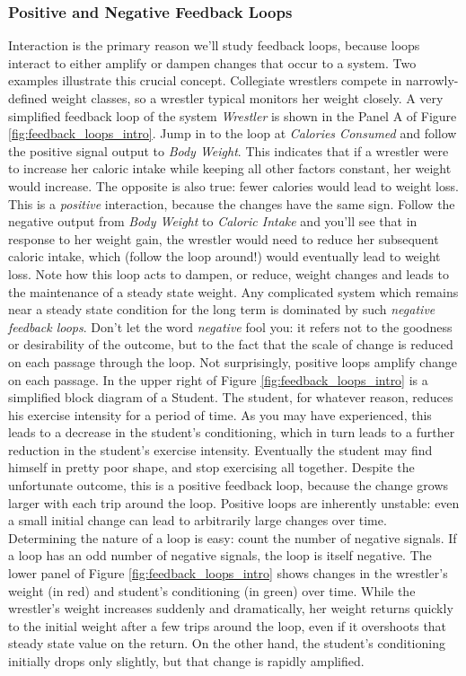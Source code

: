 \subsubsection{Positive and Negative Feedback Loops}
Interaction is the primary reason we'll study feedback loops, because loops interact to either amplify or dampen changes that occur to a system. Two examples illustrate this crucial concept. Collegiate wrestlers compete in narrowly-defined weight classes, so a wrestler typical monitors her weight closely. A very simplified feedback loop of the system \textit{Wrestler} is shown in the Panel A of Figure \ref{fig:feedback_loops_intro}. Jump in to the loop at \textit{Calories Consumed} and follow the positive signal output to \textit{Body Weight}. This indicates that if a wrestler were to increase her caloric intake while keeping all other factors constant, her weight would increase. The opposite is also true: fewer calories would lead to weight loss. This is a \emph{positive} interaction, because the changes have the same sign. Follow the negative output from \textit{Body Weight} to \textit{Caloric Intake} and you'll see that in response to her weight gain, the wrestler would need to reduce her subsequent caloric intake, which (follow the loop around!) would eventually lead to weight loss. Note how this loop acts to dampen, or reduce, weight changes and leads to the maintenance of a steady state weight. Any complicated system which remains near a steady state condition for the long term is dominated by such \emph{negative feedback loops}. Don't let the word \textit{negative} fool you: it refers not to the goodness or desirability of the outcome, but to the fact that the scale of change is reduced on each passage through the loop.
Not surprisingly, positive loops amplify change on each passage. In the upper right of Figure \ref{fig:feedback_loops_intro} is a simplified block diagram of a Student. The student, for whatever reason, reduces his exercise intensity for a period of time. As you may have experienced, this leads to a decrease in the student's conditioning, which in turn leads to a further reduction in the student's exercise intensity. Eventually the student may find himself in pretty poor shape, and stop exercising all together. Despite the unfortunate outcome, this is a positive feedback loop, because the change grows larger with each trip around the loop. Positive loops are inherently unstable: even a small initial change can lead to arbitrarily large changes over time.\\
Determining the nature of a loop is easy: count the number of negative signals. If a loop has an odd number of negative signals, the loop is itself negative. The lower panel of Figure \ref{fig:feedback_loops_intro} shows changes in the wrestler's weight (in red) and student's conditioning (in green) over time. While the wrestler's weight increases suddenly and dramatically, her weight returns quickly to the initial weight after a few trips around the loop, even if it overshoots that steady state value on the return. On the other hand, the student's conditioning initially drops only slightly, but that change is rapidly amplified.\\
